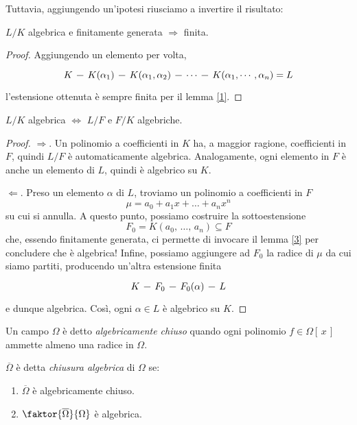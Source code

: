 \begin{multicols}{2}
Tuttavia, aggiungendo un'ipotesi riusciamo a invertire il risultato:

\begin{prop}\label{3}
	$ L/K $ algebrica e finitamente generata $ \Rightarrow $ finita.
\end{prop}
\begin{proof}
	Aggiungendo un elemento per volta,
	\[\begin{tikzcd}[column sep=0.25cm]
	K \arrow [r,-] &
	K(\alpha_1) \arrow[r,-] &
	K(\alpha_1, \alpha_2) \arrow[r,-] &
	\cdots \arrow[r,-] &
	K(\alpha_1, \cdots, \alpha_n) = L
	\end{tikzcd} \]
	 l'estensione ottenuta è sempre finita per il lemma \ref{1}.
\end{proof}
\columnbreak
\begin{prop}\label{4}
	$ L/K $ algebrica $ \Leftrightarrow $ $ L/F $ e $ F/K $ algebriche.
\end{prop}
\begin{proof}
	$ \Rightarrow $. Un polinomio a coefficienti in $ K $ ha, a maggior ragione, coefficienti in $ F $, quindi $ L/F $ è automaticamente algebrica. Analogamente, ogni elemento in $ F $ è anche un elemento di $ L $, quindi è algebrico su $ K $.
	
	$ \Leftarrow $. Preso un elemento $ \alpha $ di $ L $, troviamo un polinomio a coefficienti in $ F $
	\[ \mu = a_0 + a_1 x + \dots + a_n x^n \]
	su cui si annulla. A questo punto, possiamo costruire la sottoestensione
	\[ F_0 = K(a_0,\, \dots,\, a_n) \subseteq F \]
	che, essendo finitamente generata, ci permette di invocare il lemma \ref{3} per concludere che è algebrica! Infine, possiamo aggiungere ad $ F_0 $ la radice di $ \mu $ da cui siamo partiti, producendo un'altra estensione finita
	\[\begin{tikzcd}[column sep=0.25cm]
	K \arrow [r,-] &
	F_0 \arrow[r,-] &
	F_0(\alpha) \arrow[r,-] &
	L
	\end{tikzcd} \]
	e dunque algebrica. Così, ogni $ \alpha \in L $ è algebrico su $ K $.
\end{proof}

\begin{definition}
	Un campo $ \Omega $ è detto \emph{algebricamente chiuso} quando ogni polinomio $ f \in \Omega[\, x\,] $ ammette almeno una radice in $ \Omega $.
\end{definition}

\begin{definition}
	$ \overline{\Omega} $ è detta \emph{chiusura algebrica} di $ \Omega $ se:
	\begin{enumerate}
		\item $ \overline{\Omega} $ è algebricamente chiuso.
		\item $ \faktor{\overline{\Omega}}{\Omega} $ è algebrica.
	\end{enumerate}
\end{definition}


\end{multicols}
